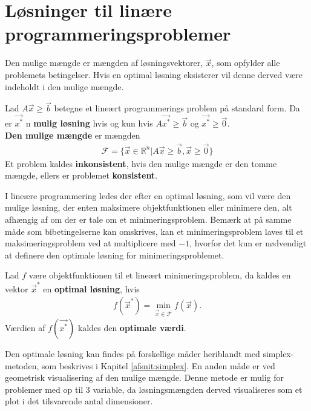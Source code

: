 \section{Løsninger til linære programmeringsproblemer}
Den mulige mængde er mængden af løsningsvektorer, $\vec{x}$, som opfylder alle problemets betingelser. Hvis en optimal løsning eksisterer vil denne derved være indeholdt i den mulige mængde.
\begin{defn}
Lad $A\vec{x}\geq \vec{b}$ betegne et lineært programmerings problem på standard form. 
Da er $\vec{x^*}$ n \textbf{mulig løsning} hvis og kun hvis $A \vec{x^*} \geq \vec{b}$ og $\vec{x^*}\geq \vec{0}$.\\
\textbf{Den mulige mængde} er mængden
\begin{align*}
\mathcal{F}=\{\vec{x} \in \mathds{R}^n|A\vec{x} \geq \vec{b}, \vec{x} \geq \vec{0}\}
\end{align*}
Et problem kaldes \textbf{inkonsistent}, hvis den mulige mængde er den tomme mængde, ellers er problemet \textbf{konsistent}.
\end{defn}
I lineære programmering ledes der efter en optimal løsning, som vil være den mulige løsning, der enten maksimere objektfunktionen eller minimere den, alt afhængig af om der er tale om et minimeringsproblem. 
Bemærk at på samme måde som bibetingelserne kan omskrives, kan et minimeringsproblem laves til et maksimeringsproblem ved at multiplicere med $-1$, hvorfor det kun er nødvendigt at definere den optimale løsning for minimeringsproblemet.
\begin{defn}
Lad $f$ være objektfunktionen til et lineært minimeringsproblem, da kaldes en vektor $\vec{x}^*$ en \textbf{optimal løsning}, hvis 
\begin{align}
	f(\vec{x}^*)=\min\limits_{\vec{x} \in \mathcal{F}}f(\vec{x}).
\end{align}
Værdien af $f(\vec{x^*})$ kaldes den \textbf{optimale værdi}.
\end{defn}

Den optimale løsning kan findes på forskellige måder heriblandt med simplex-metoden, som beskrives i Kapitel \ref{afsnit:simplex}. En anden måde er ved geometrisk visualisering af den mulige mængde. Denne metode er mulig for problemer med op til 3 variable, da løsningsmængden derved visualiseres som et plot i det tilsvarende antal dimensioner. 


